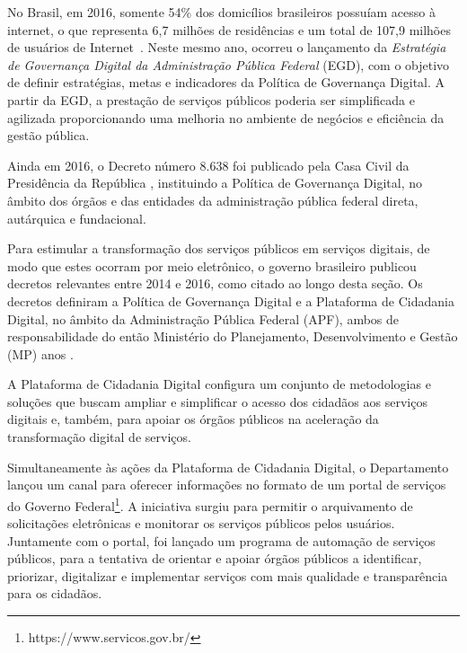 No Brasil, em 2016, somente 54\% dos domicílios brasileiros possuíam acesso à internet, o que representa 6,7 milhões de residências e um total de 107,9 milhões de usuários de Internet~\cite{CGI}. Neste mesmo ano, ocorreu o lançamento da \textit{Estratégia de Governança Digital da Administração Pública Federal} (EGD), com o objetivo de definir estratégias, metas e indicadores da Política de Governança Digital. A partir da EGD, a prestação de serviços
públicos poderia ser simplificada e agilizada proporcionando uma melhoria no ambiente de negócios e eficiência da gestão pública.

Ainda em 2016, o Decreto número 8.638 foi publicado pela Casa Civil da Presidência da República \cite{BRASIL2016c}, instituindo a Política de Governança Digital, no âmbito dos órgãos e das entidades da administração pública federal direta, autárquica e fundacional. 


Para estimular a transformação dos serviços públicos em serviços digitais, de modo que estes ocorram por meio eletrônico, o governo
brasileiro publicou decretos relevantes entre 2014 e 2016, como citado ao longo desta seção. Os decretos definiram a Política de Governança
Digital e a Plataforma de Cidadania Digital, no âmbito da Administração Pública Federal (APF), ambos de responsabilidade do então 
Ministério do Planejamento, Desenvolvimento e Gestão (MP) anos \cite{BRASIL, BRASIL2016}. 

A Plataforma de Cidadania Digital configura um conjunto de metodologias e soluções que buscam ampliar e simplificar o acesso dos cidadãos aos serviços digitais e, também, para apoiar os órgãos públicos na aceleração da transformação digital de serviços.  

Simultaneamente às ações da Plataforma de Cidadania Digital, o Departamento lançou um canal para oferecer informações no
formato de um portal de serviços do Governo Federal\footnote{https://www.servicos.gov.br/}. A iniciativa surgiu para permitir o arquivamento de solicitações eletrônicas e monitorar os serviços públicos pelos usuários. Juntamente com o portal, foi lançado um programa de automação de serviços públicos, para a tentativa de orientar e apoiar órgãos públicos a identificar, priorizar, digitalizar e implementar serviços 
com mais qualidade e transparência para os cidadãos.

